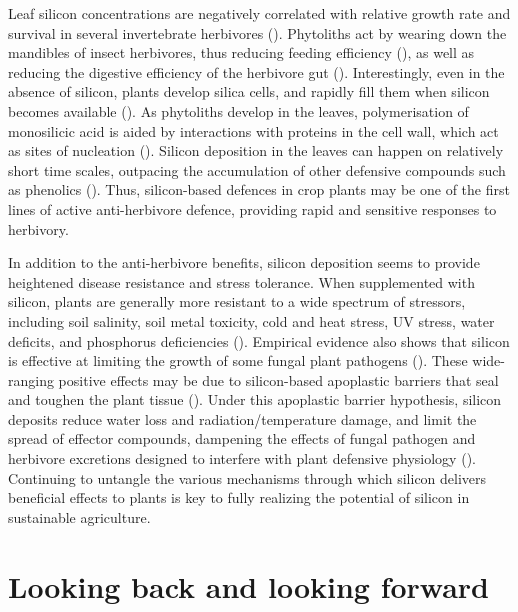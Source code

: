 \documentclass[12pt, letterpaper]{report}
\begin{document}
Leaf silicon concentrations are negatively correlated with relative growth rate and survival in several invertebrate herbivores (\cite{massey_silica_2006,juma_influence_2015,mir_silicon_2019}). Phytoliths act by wearing down the mandibles of insect herbivores, thus reducing feeding efficiency (\cite{mir_silicon_2019,waterman_short-term_2021-1}), as well as reducing the digestive efficiency of the herbivore gut (\cite{hunt_novel_2008}). Interestingly, even in the absence of silicon, plants develop silica cells, and rapidly fill them when silicon becomes available (\cite{waterman_short-term_2021-1}). As phytoliths develop in the leaves, polymerisation of monosilicic acid is aided by interactions with proteins in the cell wall, which act as sites of nucleation (\cite{nawaz_phytolith_2019}). Silicon deposition in the leaves can happen on relatively short time scales, outpacing the accumulation of other defensive compounds such as phenolics (\cite{waterman_short-term_2021}). Thus, silicon-based defences in crop plants may be one of the first lines of active anti-herbivore defence, providing rapid and sensitive responses to herbivory.

In addition to the anti-herbivore benefits, silicon deposition seems to provide heightened disease resistance and stress tolerance. When supplemented with silicon, plants are generally more resistant to a wide spectrum of stressors, including soil salinity, soil metal toxicity, cold and heat stress, UV stress, water deficits, and phosphorus deficiencies (\cite{cooke_consistent_2016}). Empirical evidence also shows that silicon is effective at limiting the growth of some fungal plant pathogens (\cite{fauteux_silicon_2005}). These wide-ranging positive effects may be due to silicon-based apoplastic barriers that seal and toughen the plant tissue (\cite{coskun_controversies_2019}). Under this apoplastic barrier hypothesis, silicon deposits reduce water loss and radiation/temperature damage, and limit the spread of effector compounds, dampening the effects of fungal pathogen and herbivore excretions designed to interfere with plant defensive physiology (\cite{coskun_controversies_2019}). Continuing to untangle the various mechanisms through which silicon delivers beneficial effects to plants is key to fully realizing the potential of silicon in sustainable agriculture.

\section{Looking back and looking forward}
\end{document}
